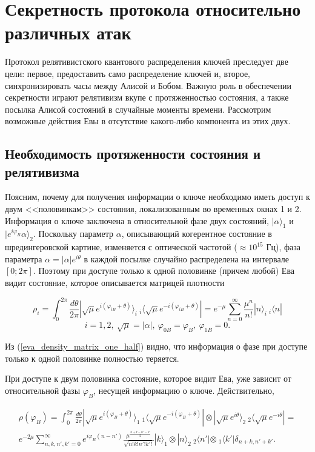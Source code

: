 \section{Секретность протокола относительно различных атак}
Протокол релятивистского квантового распределения ключей преследует две цели: первое, предоставить само распределение ключей и, второе, синхронизировать часы между Алисой и Бобом.
Важную роль в обеспечении секретности играют релятивизм вкупе с протяженностью состояния, а также посылка Алисой состояний в случайные моменты времени.
Рассмотрим возможные действия Евы в отсутствие какого-либо компонента из этих двух.

\subsection{Необходимость протяженности состояния и релятивизма}
Поясним, почему для получения информации о ключе необходимо иметь доступ к двум <<половинкам>> состояния, локализованным во временных окнах 1 и 2. 
Информация о ключе заключена в относительной фазе двух состояний, $|\alpha\rangle_1$ и $|e^{i\varphi_B}\alpha\rangle_2$.
Поскольку параметр $\alpha$, описывающий когерентное состояние в шредингеровской картине, изменяется с оптической частотой ($\approx 10^{15}$ Гц), фаза параметра $\alpha = |\alpha|e^{i\theta}$
в каждой посылке случайно распределена на интервале $[0; 2\pi]$. Поэтому при доступе только к одной половинке (причем любой) Ева видит состояние, которое описывается матрицей плотности

\begin{equation}\label{eva_density_matrix_one_half}
    \rho_i = \int^{2\pi}_0 
{\frac{d\theta}{2\pi} 
|\sqrt{\mu} e^{i(\varphi_{iB} + \theta)} \rangle_i ~ 
{}_i \langle \sqrt{\mu}e^{-i(\varphi_{iB} + \theta)} | } = 
e^{-\mu} \sum^\infty_{n=0} {\frac{\mu^n}{n!} |n\rangle_i ~{}_i \langle n | }
\end{equation}
\begin{equation*}
  i = 1,2,~\sqrt{\mu}=|\alpha|,~\varphi_{0B} = \varphi_B,~\varphi_{1B} = 0.
\end{equation*}

Из (\ref{eva_density_matrix_one_half}) видно, что информация о фазе при доступе только к одной половинке полностью теряется.

При доступе к двум половинка состояние, которое видит Ева, уже зависит от относительной фазы $\varphi_B$, несущей информацию о ключе. Действительно,

\begin{eqnarray}\label{eva_density_matrix_full}
    \rho(\varphi_B) = \int^{2\pi}_0 
{
\frac{d\theta}{2\pi} 
|\sqrt{\mu} e^{i(\varphi_{B} + \theta)} \rangle_1 ~ 
{}_1 \langle \sqrt{\mu}e^{-i(\varphi_{B} + \theta)} |
\otimes
|\sqrt{\mu} e^{i\theta} \rangle_2 ~ 
{}_2 \langle \sqrt{\mu}e^{-i\theta} |
} =  \nonumber\\
e^{-2\mu} \sum^\infty_{n,k,n',k'=0} 
{
  e^{i\varphi_B(n-n')}
  \frac
    {\mu^{\frac{n+k-n'-k'}{2}}}
    {\sqrt{n!k!n'!k'!}} 
  |k\rangle_1 
  \otimes
  |n\rangle_2 ~{}_2 \langle n' | 
  \otimes
  ~{}_1 \langle k' | \delta_{n+k,n'+k'}.
}
\end{eqnarray}

